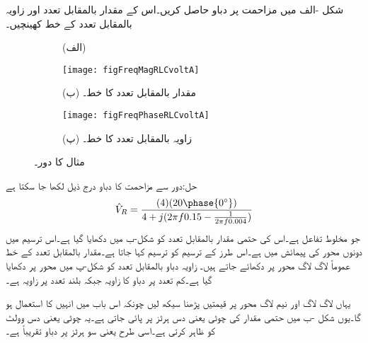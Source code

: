 شکل -الف میں مزاحمت پر دباو حاصل کریں۔اس کے مقدار بالمقابل تعدد اور زاویہ بالمقابل تعدد کے خط کھینچیں۔
\begin{figure}
\centering
\begin{subfigure}{1\textwidth}
\centering
{}
\caption*{(الف)}
\end{subfigure}
\begin{subfigure}{1\textwidth}
\centering
\texttt{[image: figFreqMagRLCvoltA]}
\caption*{(ب) مقدار بالمقابل تعدد کا خط۔}
\end{subfigure}
\begin{subfigure}{1\textwidth}
\centering
\texttt{[image: figFreqPhaseRLCvoltA]}
\caption*{(پ) زاویہ بالمقابل تعدد کا خط۔}
\end{subfigure}
\caption{مثال  کا دور۔}
\label{شکل_تعددی_بوڈا_خط_مزاحمت_امالہ_برق_گیر_رو_الف}
\end{figure}

حل:دور سے مزاحمت کا دباو درج ذیل لکھا جا سکتا ہے
\begin{align*}
\hat{V}_R=\frac{(4)(20\phase{0^{\circ}})}{4+j(2\pi f 0.15-\frac{1}{2\pi f 0.004})}
\end{align*}
جو مخلوط تفاعل ہے۔اس کی حتمی مقدار  بالمقابل تعدد  کو شکل-ب میں دکھایا گیا ہے۔اس ترسیم میں دونوں محور کی پیمائش  میں ہے۔اس طرز کے ترسیم کو  ترسیم کہا جاتا  ہے۔مقدار بالمقابل تعدد کے خط عموماً لاگ لاگ محور پر دکھائے جاتے ہیں۔ زاویہ دباو  بالمقابل تعدد کو شکل-پ میں  محور پر دکھایا گیا ہے۔کم تعدد پر دباو کا زاویہ  جبکہ بلند تعدد پر زاویہ  ہے۔

یہاں لاگ لاگ اور نیم لاگ محور پر قیمتیں پڑھنا سیکھ لیں چونکہ اس باب میں انہیں کا استعمال ہو گا۔یوں شکل -ب میں  حتمی مقدار کی چوٹی  یعنی دس ہرٹز پر پائی جاتی ہے۔یہ چوٹی  یعنی دس وولٹ کو ظاہر کرتی ہے۔اسی طرح  یعنی سو ہرٹز پر دباو تقریباً   ہے۔

